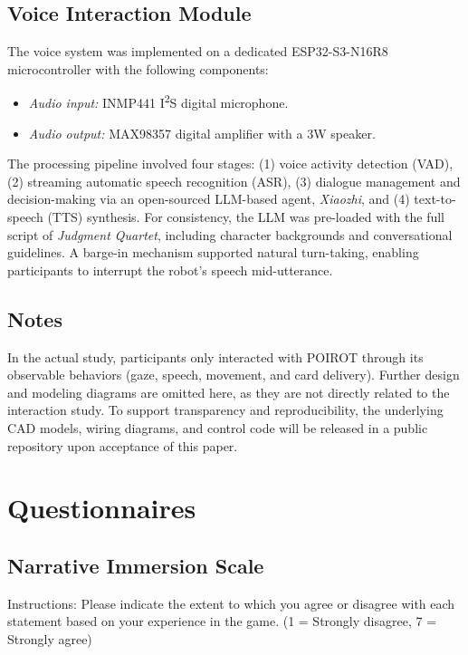 \documentclass[sigconf,screen]{acmart-tagged}
\begin{document}
\subsection{Voice Interaction Module}
\label{voice interaction module}
The voice system was implemented on a dedicated ESP32-S3-N16R8 microcontroller with the following components:  
\begin{itemize}
    \item \textit{Audio input:} INMP441 I\textsuperscript{2}S digital microphone.  
    \item \textit{Audio output:} MAX98357 digital amplifier with a 3W speaker.  
\end{itemize}

The processing pipeline involved four stages: (1) voice activity detection (VAD), (2) streaming automatic speech recognition (ASR), (3) dialogue management and decision-making via an open-sourced LLM-based agent, \textit{Xiaozhi}, and (4) text-to-speech (TTS) synthesis. For consistency, the LLM was pre-loaded with the full script of \textit{Judgment Quartet}, including character backgrounds and conversational guidelines. A barge-in mechanism supported natural turn-taking, enabling participants to interrupt the robot's speech mid-utterance.

\subsection{Notes}
In the actual study, participants only interacted with POIROT through its observable behaviors (gaze, speech, movement, and card delivery). Further design and modeling diagrams are omitted here, as they are not directly related to the interaction study. To support transparency and reproducibility, the underlying CAD models, wiring diagrams, and control code will be released in a public repository upon acceptance of this paper.


\section{Questionnaires}
\label{appendix:questionnaires}

\subsection{Narrative Immersion Scale}
\label{survey:immersion}
\noindent
Instructions: Please indicate the extent to which you agree or disagree with each statement based on your experience in the game. (1 = Strongly disagree, 7 = Strongly agree)
\end{document}
